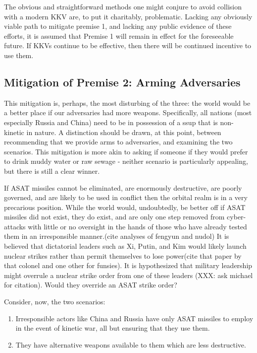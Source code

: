 The obvious and straightforward methods one might conjure to avoid
collision with a modern KKV are, to put it charitably, problematic.
Lacking any obviously viable path to mitigate premise 1, and lacking
any public evidence of these efforts, it is assumed that Premise 1
will remain in effect for the foreseeable future.  If KKVs continue to
be effective, then there will be continued incentive to use them.

\subsection{Mitigation of Premise 2: Arming Adversaries}
This mitigation is, perhaps, the most disturbing of the three: the
world would be a better place if our adversaries had more weapons.
Specifically, all nations (most especially Russia and China) need to
be in possession of a \acf{ssup} that is non-kinetic in nature.  A
distinction should be drawn, at this point, between recommending that
we provide arms to adversaries, and examining the two scenarios.  This
mitigation is more akin to asking if someone if they would prefer to
drink muddy water or raw sewage - neither scenario is particularly
appealing, but there is still a clear winner.

If ASAT missiles cannot be eliminated, are enormously destructive, are
poorly governed, and are likely to be used in conflict then the
orbital realm is in a very precarious position.  While the world
would, undoubtedly, be better off if ASAT missiles did not exist, they
do exist, and are only one step removed from cyber-attacks with little
or no oversight in the hands of those who have already tested them in
an irresponsible manner.(cite analyses of fengyun and nudol) It is
believed that dictatorial leaders such as Xi, Putin, and Kim would
likely launch nuclear strikes rather than permit themselves to lose
power(cite that paper by that colonel and one other for funsies).  It
is hypothesized that military leadership might overrule a nuclear
strike order from one of these leaders (XXX: ask michael for
citation).  Would they override an ASAT strike order?

Consider, now, the two scenarios:

\begin{enumerate}
\item Irresponsible actors like China and Russia have only ASAT
  missiles to employ in the event of kinetic war, all but ensuring
  that they use them.

\item They have alternative weapons available to them which are less
  destructive.
\end{enumerate}

